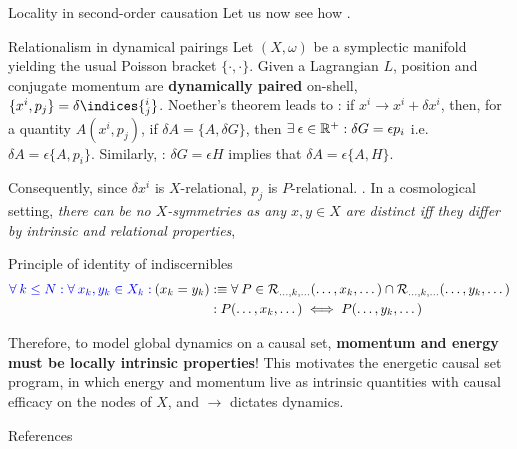 \documentclass[final]{beamer}
\newlength{\colwidth}
\newcommand{\fa}{\forall \:}
\newcommand{\mc}{\mathcal}
\theoremstyle{remark}
\begin{document}
\begin{frame}[t]
\begin{columns}[t]
\begin{column}{\colwidth}
\begin{block}{Locality in second-order causation}
Let us now see how .
\end{block}

\begin{block}{Relationalism in dynamical pairings}
Let $(X, \omega)$ be a symplectic manifold yielding the usual Poisson bracket $\{ \cdot, \cdot \}$. Given a Lagrangian $L$, position and conjugate momentum are \textbf{dynamically paired} on-shell, $\{ x^i, p_j \} = \delta\indices{^i_j}$. Noether's theorem leads to : if $x^i \to x^i + \delta x^i$, then, for a quantity $A(x^i, p_j)$, if $\delta A = \{ A, \delta G \}$, then $\exists \: \epsilon \in \mathbb{R}^+ : \delta G = \epsilon p_i$ i.e. $\delta A = \epsilon \{ A, p_i \}$. Similarly, : $\delta G = \epsilon H$ implies that $\delta A = \epsilon \{ A, H \}$.

Consequently, since $\delta x^i$ is $X$-relational, $p_j$ is $P$-relational. . In a cosmological setting, \emph{there can be no $X$-symmetries as any $x, y \in X$ are distinct iff they differ by intrinsic and relational properties},

\begin{alertblock}{Principle of identity of indiscernibles}
\begin{align*}
\qua{\fa k \leq N : \fa x_k, y_k \in X_k :} (x_k = y_k) & : \equiv \fa P \in \mc{R}_{\dots, k, \dots}(\dots, x_k, \dots) \cap \mc{R}_{\dots, k, \dots}(\dots, y_k, \dots) \\
& : P(\dots, x_k, \dots) \iff P(\dots, y_k, \dots)
\end{align*}
\end{alertblock}

Therefore, to model global dynamics on a causal set, \textbf{momentum and energy must be locally intrinsic properties}! This motivates the energetic causal set program, in which energy and momentum live as intrinsic quantities with causal efficacy on the nodes of $X$, and $\to$ dictates dynamics.
\end{block}

\begin{block}{References}
\nocite{*}
\footnotesize{}
\end{block}

\end{column}

\end{columns}
\end{frame}
\end{document}
